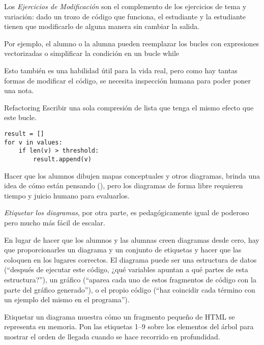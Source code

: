 Los \emph{Ejercicios de Modificación} son el complemento de los ejercicios de  tema y variación: 
dado un trozo de código que funciona, el estudiante y la estudiante tienen que modificarlo de alguna manera sin cambiar la salida.

Por ejemplo, 
el alumno o la alumna pueden reemplazar los bucles con expresiones vectorizadas
 o simplificar la condición en un bucle while

Esto también es una habilidad útil para la vida real, 
pero como hay tantas formas de modificar el código,
se necesita inspección humana para poder poner una nota.

\begin{aside}{Refactoring}
  Escribir una sola compresión de lista que tenga el mismo efecto que este bucle.

\begin{verbatim}
result = []
for v in values:
    if len(v) > threshold:
        result.append(v)
\end{verbatim}
\end{aside}



Hacer que los alumnos dibujen mapas conceptuales y otros diagramas, brinda una idea de cómo están pensando (),
pero los diagramas de forma libre requieren tiempo y juicio humano para evaluarlos.

\emph{Etiquetar los diagramas},
por otra parte, 
es pedagógicamente igual de poderoso 
pero mucho más fácil de escalar.

En lugar de hacer que los alumnos y las alumnas creen diagramas desde cero, hay que proporcionarles un diagrama y un conjunto de etiquetas y hacer que las coloquen en  los lugares correctos.
El diagrama puede ser una estructura de datos (``después de ejecutar este código, ¿qué variables apuntan a qué partes de esta estructura?''), un gráfico (``aparea cada uno de estos fragmentos de código con la parte del gráfico generado''), o el propio código (``haz coincidir cada término con un ejemplo del mismo en el programa'').

\begin{aside}{Etiquetar un diagrama}
   muestra
cómo un fragmento pequeño de HTML se representa en memoria.
  Pon las etiquetas 1--9 sobre los elementos del árbol 
  para mostrar el orden de llegada cuando se hace recorrido en profundidad.
\end{aside}


